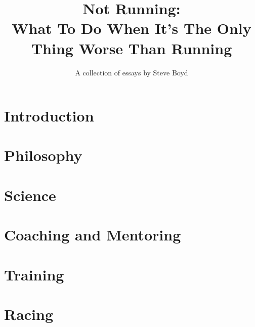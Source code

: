 \documentclass[openany]{book}
\title{\Huge{Not Running:} \\ \Large{What To Do When It's The Only Thing Worse Than Running}}
\author{A collection of essays by Steve Boyd}
\date{}
\newcommand\blankpage{%
    \null
    \thispagestyle{empty}%
    \addtocounter{page}{-1}%
    \newpage}
\begin{document}
\afterpage{\blankpage}

\maketitle

\tableofcontents

\afterpage{\blankpage}

\part{Introduction}


\part{Philosophy}










\part{Science}









\part{Coaching and Mentoring}








\part{Training}







\part{Racing}





\end{document}
